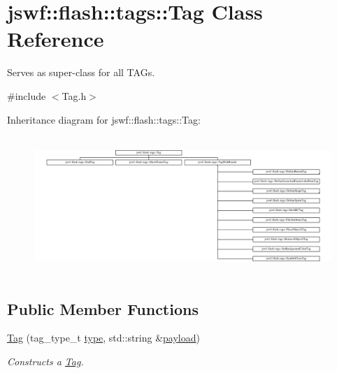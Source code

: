 \hypertarget{classjswf_1_1flash_1_1tags_1_1_tag}{\section{jswf\+:\+:flash\+:\+:tags\+:\+:Tag Class Reference}
\label{classjswf_1_1flash_1_1tags_1_1_tag}
}


Serves as super-\/class for all {\ttfamily T\+A\+G}s.  




{\ttfamily \#include $<$Tag.\+h$>$}

Inheritance diagram for jswf\+:\+:flash\+:\+:tags\+:\+:Tag\+:\begin{figure}[H]
\begin{center}
\leavevmode
\includegraphics[height=5.250000cm]{classjswf_1_1flash_1_1tags_1_1_tag}
\end{center}
\end{figure}
\subsection*{Public Member Functions}
\begin{DoxyCompactItemize}
\item 
\hypertarget{classjswf_1_1flash_1_1tags_1_1_tag_a1e7f79a28c1da07bea68e0d256405f1c}{\hyperlink{classjswf_1_1flash_1_1tags_1_1_tag_a1e7f79a28c1da07bea68e0d256405f1c}{Tag} (tag\+\_\+type\+\_\+t \hyperlink{classjswf_1_1flash_1_1tags_1_1_tag_a3152409242986a8c0c89156f1dabc5e2}{type}, std\+::string \&\hyperlink{classjswf_1_1flash_1_1tags_1_1_tag_a56525f85068803819fa64e868801c492}{payload})}\label{classjswf_1_1flash_1_1tags_1_1_tag_a1e7f79a28c1da07bea68e0d256405f1c}

\begin{DoxyCompactList}\small\item\em Constructs a \hyperlink{classjswf_1_1flash_1_1tags_1_1_tag}{Tag}. \end{DoxyCompactList}\end{DoxyCompactItemize}
